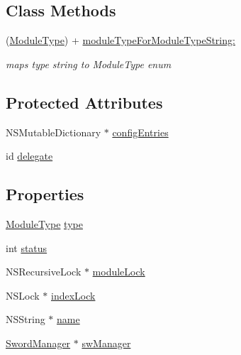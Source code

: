 \subsection*{Class Methods}
\begin{DoxyCompactItemize}
\item 
(\hyperlink{_sword_module_8h_a224128d35337e2b42cebf846d4d0c6f1}{Module\-Type}) + \hyperlink{interface_sword_module_a27dfdaad96c169472cfdcb19216cf0cb}{module\-Type\-For\-Module\-Type\-String\-:}
\begin{DoxyCompactList}\small\item\em maps type string to Module\-Type enum \end{DoxyCompactList}\end{DoxyCompactItemize}
\subsection*{Protected Attributes}
\begin{DoxyCompactItemize}
\item 
N\-S\-Mutable\-Dictionary $\ast$ \hyperlink{interface_sword_module_aac92b28c82e8e90e1f41471b3f3d65dc}{config\-Entries}
\item 
id \hyperlink{interface_sword_module_a8d9332fcd23523b1e2520b8765577423}{delegate}
\end{DoxyCompactItemize}
\subsection*{Properties}
\begin{DoxyCompactItemize}
\item 
\hyperlink{_sword_module_8h_a224128d35337e2b42cebf846d4d0c6f1}{Module\-Type} \hyperlink{interface_sword_module_a69cc06aed2c7e6cbe7b4c09b62e4a57d}{type}
\item 
int \hyperlink{interface_sword_module_a6e27f49150e9a14580fb313cc2777e00}{status}
\item 
N\-S\-Recursive\-Lock $\ast$ \hyperlink{interface_sword_module_aa2dfd95c39168ffc06d703d959384b2c}{module\-Lock}
\item 
N\-S\-Lock $\ast$ \hyperlink{interface_sword_module_a115e80b1eaefdb1701dfa8f108df190c}{index\-Lock}
\item 
N\-S\-String $\ast$ \hyperlink{interface_sword_module_afc8ccc6676addc3b49a494b2bf969c68}{name}
\item 
\hyperlink{interface_sword_manager}{Sword\-Manager} $\ast$ \hyperlink{interface_sword_module_a387446958708000f3a5ea20ff5f340db}{sw\-Manager}
\end{DoxyCompactItemize}


